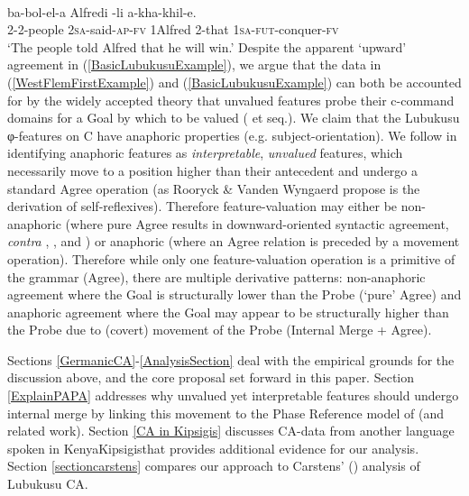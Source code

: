 \documentclass[output=paper
,modfonts
,nonflat
]{langsci/langscibook}
\begin{document}
\ea \label{BasicLubukusuExample}
\\
\gll {}	ba-bol-el-a	Alfredi	-li	a-kha-khil-e.\\
	2-2-people 	2\textsc{sa}-said-\textsc{ap}-\textsc{fv}	1Alfred	2-that	1\textsc{sa}-\textsc{fut}-conquer-\textsc{fv} \\
\glt `The people told Alfred that he will win.'	
\z
\noindent Despite the apparent `upward' agreement in (\ref{BasicLubukusuExample}), we argue that the data in (\ref{WestFlemFirstExample}) and (\ref{BasicLubukusuExample}) can both be accounted for by the widely accepted theory that unvalued features probe their c-command domains for a Goal by which to be valued (\citealt{Chomsky2000} et seq.).  We claim that the Lubukusu φ-features on C have anaphoric properties (e.g. subject-orientation). We follow \citet{Rooryck:2011} in identifying anaphoric features as \textit{interpretable}, \textit{unvalued} features, which necessarily move to a position higher than their antecedent and undergo a standard Agree operation (as Rooryck \& Vanden Wyngaerd \citeyear{Rooryck:2011} propose is the derivation of self-reflexives). Therefore feature-valuation may either be non-anaphoric (where pure Agree results in downward-oriented syntactic agreement, \textit{contra} \citealt{Zeijlstra:2012}, \citealt{Wurmbrand:2011}, and \citealt{Bjorkman:toappearb}) or anaphoric (where an Agree relation 
is preceded by a movement operation). Therefore while only one feature-valuation operation is a primitive of the grammar (Agree), there are multiple derivative patterns: non-anaphoric agreement where the Goal is structurally lower than the Probe (`pure' Agree) and anaphoric agreement where the Goal may appear to be structurally higher than the Probe due to (covert) movement of the Probe (Internal Merge + Agree). 

Sections \ref{GermanicCA}-\ref{AnalysisSection} deal with the empirical grounds for the discussion above, and the core proposal set forward in this paper. Section \ref{ExplainPAPA} addresses why unvalued yet interpretable features should undergo internal merge by linking this movement to the Phase Reference model of \citet{Hinzen:2012} (and related work). Section \ref{CA in Kipsigis} discusses CA-data from another language spoken in Kenya\textemdash Kipsigis\textemdash that provides additional evidence for our analysis. Section \ref{sectioncarstens} compares our approach to Carstens' (\citeyear{Carstens:2016}) analysis of Lubukusu CA.
\end{document}
